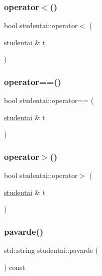 \subsubsection{\texorpdfstring{operator$<$()}{operator<()}}
{\footnotesize\ttfamily bool studentai\+::operator$<$ (\begin{DoxyParamCaption}\item[{\mbox{\hyperlink{classstudentai}{studentai}} \&}]{t }\end{DoxyParamCaption})\hspace{0.3cm}{\ttfamily [inline]}}

\mbox{\label{classstudentai_a31c7f035921dbc25bea25f46b1813151}} 
\subsubsection{\texorpdfstring{operator==()}{operator==()}}
{\footnotesize\ttfamily bool studentai\+::operator== (\begin{DoxyParamCaption}\item[{\mbox{\hyperlink{classstudentai}{studentai}} \&}]{t }\end{DoxyParamCaption})\hspace{0.3cm}{\ttfamily [inline]}}

\mbox{\label{classstudentai_a2addcff31136907fcff986ac4b0b321c}} 
\subsubsection{\texorpdfstring{operator$>$()}{operator>()}}
{\footnotesize\ttfamily bool studentai\+::operator$>$ (\begin{DoxyParamCaption}\item[{\mbox{\hyperlink{classstudentai}{studentai}} \&}]{t }\end{DoxyParamCaption})\hspace{0.3cm}{\ttfamily [inline]}}

\mbox{\label{classstudentai_a5096a46bb2a2a1bdbc41b3fb89417fa5}} 
\subsubsection{\texorpdfstring{pavarde()}{pavarde()}}
{\footnotesize\ttfamily std\+::string studentai\+::pavarde (\begin{DoxyParamCaption}{ }\end{DoxyParamCaption}) const\hspace{0.3cm}{\ttfamily [inline]}}

